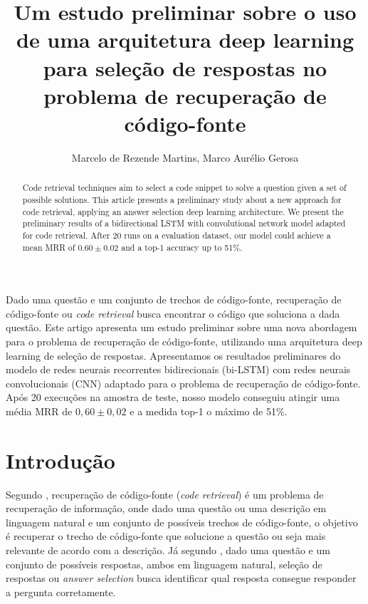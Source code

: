\documentclass[12pt]{article}
\title{Um estudo preliminar sobre o uso de uma arquitetura deep learning para seleção de respostas no problema de recuperação de código-fonte}
\author{Marcelo de Rezende Martins\inst{1}, Marco Aurélio Gerosa\inst{2}}
\begin{document}
 

\maketitle

\begin{abstract}
  Code retrieval techniques aim to select a code snippet to solve a question given a set of possible solutions. This article presents a preliminary study about a new approach for code retrieval, applying an answer selection deep learning architecture. We present the preliminary results of a bidirectional LSTM with convolutional network model adapted for code retrieval. After 20 runs on a evaluation dataset, our model could achieve a mean MRR of $0.60 \pm 0.02$ and a top-1 accuracy up to 51\%.
\end{abstract}
     
\begin{resumo} 
  Dado uma questão e um conjunto de trechos de código-fonte, recuperação de código-fonte ou \textit{code retrieval} busca encontrar o código que soluciona a dada questão. Este artigo apresenta um estudo preliminar sobre uma nova abordagem para o problema de recuperação de código-fonte, utilizando uma arquitetura deep learning de seleção de respostas. Apresentamos os resultados preliminares do modelo de redes neurais recorrentes bidirecionais (bi-LSTM) com redes neurais convolucionais (CNN) adaptado para o problema de recuperação de código-fonte. Após 20 execuções na amostra de teste, nosso modelo conseguiu atingir uma média MRR de $0,60 \pm 0,02$ e a medida top-1 o máximo de 51\%.
\end{resumo}


\section{Introdução}

Segundo \cite{Allamanis-bimodal-source-code-natural-language:2015}, recuperação de código-fonte (\textit{code retrieval}) é um problema de recuperação de informação, onde dado uma questão ou uma descrição em linguagem natural e um conjunto de possíveis trechos de código-fonte, o objetivo é recuperar o trecho de código-fonte que solucione a questão ou seja mais relevante de acordo com a descrição. Já segundo \cite{lai-etal-2018-review}, dado uma questão e um conjunto de possíveis respostas, ambos em linguagem natural, seleção de respostas ou \textit{answer selection} busca identificar qual resposta consegue responder a pergunta corretamente. 
\end{document}
